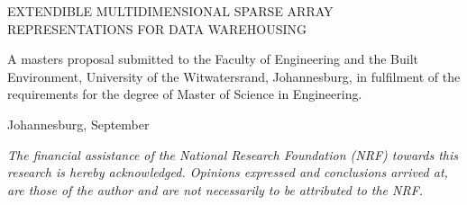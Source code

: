 \documentclass[MScDiss,altheaders,colorlinks,a4paper]{wits-eie-thesis}
\begin{document}
	
\begin{titlepage}
	\setcounter{page}{0}  %
	\vspace*{50pt}
	{\Large \bfseries \raggedright EXTENDIBLE MULTIDIMENSIONAL SPARSE ARRAY REPRESENTATIONS FOR DATA WAREHOUSING\par} 
	\vspace*{40pt}
	\vspace*{\fill}{\large \scshape \centering \eeThDraft \par}
	\vspace{\fill}
	\ifx\@putlogo\@putlogotrue
	{
		\begin{center}\end{center}
	}
	\fi
	\vspace{\fill}
	{
		A %
		masters proposal submitted to the Faculty of Engineering and the Built Environment, University of the Witwatersrand, Johannesburg, in fulfilment of the requirements for the degree of Master of Science in Engineering.\par
		\vspace*{2em}
		Johannesburg, September
		
		\vspace*{1em}
		\normalsize
		\textit {The financial assistance of the National Research Foundation (NRF) towards this research is hereby acknowledged. Opinions expressed and conclusions arrived at, are those of the author and are not necessarily to be attributed to the NRF.}
	}
\end{titlepage}
	
\end{document}
